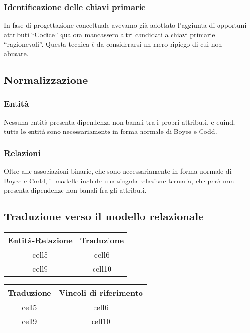 \documentclass{article}
\begin{document}
\subsubsection{Identificazione delle chiavi primarie}

In fase di progettazione concettuale avevamo già adottato l'aggiunta di
opportuni attributi ``Codice'' qualora mancassero altri candidati a chiavi
primarie ``ragionevoli''. Questa tecnica è da considerarsi un mero ripiego di cui
non abusare.

\subsection{Normalizzazione}

\subsubsection{Entità}

Nessuna entità presenta dipendenza non banali tra i propri attributi, e quindi
tutte le entità sono necessariamente in forma normale di Boyce e Codd.

\subsubsection{Relazioni}

Oltre alle associazioni binarie, che sono necessariamente in forma normale di
Boyce e Codd, il modello include una singola relazione ternaria, che però non
presenta dipendenze non banali fra gli attributi.

\subsection{Traduzione verso il modello relazionale}

\begin{center}\begin{tabular}{ |c|c| }
		\hline
		\textbf{Entità-Relazione} & \textbf{Traduzione} \\
		\hline
		cell5                     & cell6               \\
		\hline
		cell9                     & cell10              \\
		\hline
	\end{tabular}\end{center}

\begin{center}\begin{tabular}{ |c|c| }
		\hline
		\textbf{Traduzione} & \textbf{Vincoli di riferimento} \\
		\hline
		cell5               & cell6                           \\
		\hline
		cell9               & cell10                          \\
		\hline
	\end{tabular}\end{center}
\end{document}
